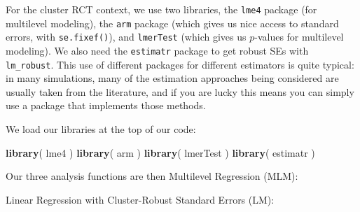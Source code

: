 \documentclass[
]{book}
\newenvironment{Shaded}{\begin{snugshade}}{\end{snugshade}}
\newcommand{\AttributeTok}[1]{\textcolor[rgb]{0.13,0.29,0.53}{#1}}
\newcommand{\ControlFlowTok}[1]{\textcolor[rgb]{0.13,0.29,0.53}{\textbf{#1}}}
\newcommand{\DecValTok}[1]{\textcolor[rgb]{0.00,0.00,0.81}{#1}}
\newcommand{\FunctionTok}[1]{\textcolor[rgb]{0.13,0.29,0.53}{\textbf{#1}}}
\newcommand{\NormalTok}[1]{#1}
\newcommand{\OtherTok}[1]{\textcolor[rgb]{0.56,0.35,0.01}{#1}}
\newcommand{\SpecialCharTok}[1]{\textcolor[rgb]{0.81,0.36,0.00}{\textbf{#1}}}
\newcommand{\StringTok}[1]{\textcolor[rgb]{0.31,0.60,0.02}{#1}}
\begin{document}
For the cluster RCT context, we use two libraries, the \texttt{lme4} package (for multilevel modeling), the \texttt{arm} package (which gives us nice access to standard errors, with \texttt{se.fixef()}), and \texttt{lmerTest} (which gives us \(p\)-values for multilevel modeling).
We also need the \texttt{estimatr} package to get robust SEs with \texttt{lm\_robust}.
This use of different packages for different estimators is quite typical: in many simulations, many of the estimation approaches being considered are usually taken from the literature, and if you are lucky this means you can simply use a package that implements those methods.

We load our libraries at the top of our code:

\begin{Shaded}
\begin{Highlighting}[]
\FunctionTok{library}\NormalTok{( lme4 )}
\FunctionTok{library}\NormalTok{( arm )}
\FunctionTok{library}\NormalTok{( lmerTest )}
\FunctionTok{library}\NormalTok{( estimatr )}
\end{Highlighting}
\end{Shaded}

Our three analysis functions are then Multilevel Regression (MLM):

\begin{Shaded}
\end{Shaded}

Linear Regression with Cluster-Robust Standard Errors (LM):
\end{document}
